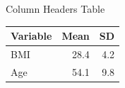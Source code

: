 \documentclass[14pt,t]{beamer}
\begin{document}
\begin{frame}{Column Headers Table}
\begin{table}
\centering
\begin{tabular}{lrr}
\hline
Variable & Mean & SD \\
\hline
BMI & 28.4 & 4.2 \\
Age & 54.1 & 9.8 \\
\hline
\end{tabular}
\end{table}
\end{frame}
\end{document}
